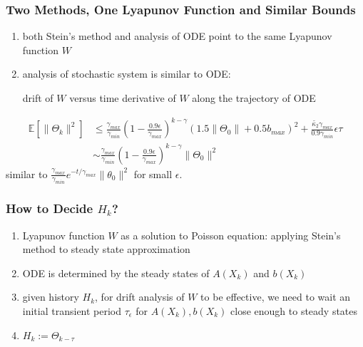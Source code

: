 \documentclass[t,10pt]{beamer}
\newcommand{\E}{\mathbb{E}}
\theoremstyle{remark}
\begin{document}



\begin{frame}
\frametitle{Two Methods, One Lyapunov Function and Similar Bounds}
\begin{enumerate}
\item both Stein's method and analysis of ODE point to the same Lyapunov function $W$
\item analysis of stochastic system is similar to ODE: 

drift of $W$ versus time derivative of $W$ along the trajectory of ODE
\end{enumerate}
\begin{align}
\E[ \|\Theta_k\|^2] &\leq \frac{\gamma_{max}}{\gamma_{min}}\left(1-\frac{0.9\epsilon}{\gamma_{max}}\right)^{k-\gamma} (1.5\|\Theta_0\|+0.5 b_{max})^2 + \frac{\tilde{\kappa_2} \gamma_{max}}{0.9\gamma_{min}} \epsilon \tau \\
&\sim \frac{\gamma_{max}}{\gamma_{min}}\left(1-\frac{0.9\epsilon}{\gamma_{max}}\right)^{k-\gamma} \|\Theta_0\|^2
\end{align}
similar to $\frac{\gamma_{max}}{\gamma_{min}}e^{-t/\gamma_{max}}\|\theta_0\|^2$ for small $\epsilon$. 

\end{frame}










\begin{frame}
\frametitle{How to Decide $H_k$?}
\begin{enumerate}
\item Lyapunov function $W$ as a solution to Poisson equation: applying Stein's method to steady state approximation
\item  ODE is determined by the steady states of $A(X_k)$ and $b(X_k)$
\item given history $H_k$, for drift analysis of $W$ to be effective, we need to wait an initial transient period $\tau_\epsilon$ for $A(X_k), b(X_k)$ close enough to steady states
\item $H_k :=  \Theta_{k-\tau}$


\end{enumerate}


\end{frame}
\end{document}
